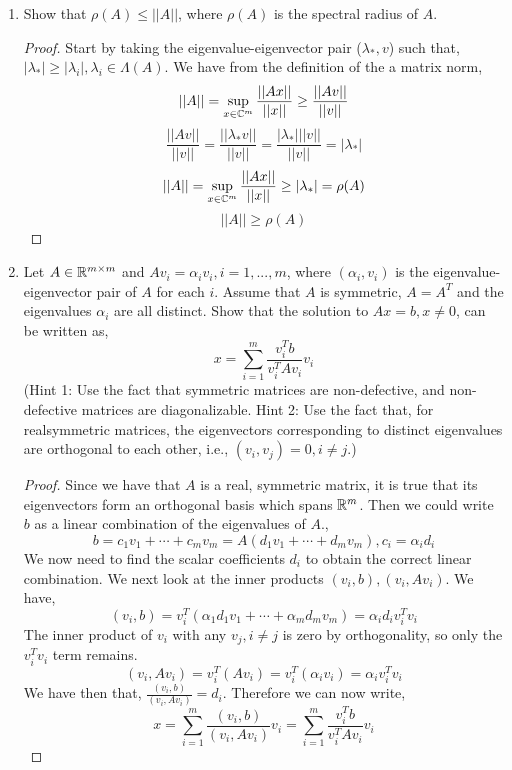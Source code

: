 \documentclass{article}
\begin{document}
\begin{enumerate}
\begin{enumerate}
\begin{proof}
        \end{proof}

        \item

     \end{enumerate}
    
     \item 
      Show that $\rho(A) \le ||A||$, where $\rho(A)$ is the spectral radius of $A$.
    
    \begin{proof}

    Start by taking the eigenvalue-eigenvector pair ($\lambda_*, v$) such that, $|\lambda_*| \ge |\lambda_i|, \lambda_i \in \Lambda(A)$. We have from the definition of the a matrix norm, 
    \[
        ||A|| = \sup_{x \in \mathbb{C}^m} \frac{||Ax||}{||x||} \ge \frac{||Av||}{||v||}
    \]
    \[
        \frac{||Av||}{||v||} = \frac{||\lambda_* v||}{||v||} = \frac{|\lambda_*| ||v||}{||v||} = |\lambda_*|
    \]
    \[
        ||A|| = \sup_{x \in \mathbb{C}^m} \frac{||Ax||}{||x||} \ge |\lambda_*| = \rho(A)
    \]
    \[
        ||A|| \ge \rho(A)   
    \]
    \end{proof}

    \item 
    Let $A \in \mathbb{R}^{m\times m}$ and $Av_i = \alpha_i v_i, i = 1, . . . , m$, where $(\alpha_i , v_i)$ is the eigenvalue-eigenvector pair of $A$ for each $i$. Assume that $A$ is symmetric, $A = A^T$ and the eigenvalues $\alpha_i$ are all distinct. Show that the solution to $Ax = b, x \neq 0$, can be written as, 
\[
    x = \sum_{i=1}^m\frac{v_i^Tb}{v_i^TAv_i}v_i
\]
(Hint 1: Use the fact that symmetric matrices are non-defective, and non-defective matrices are diagonalizable. Hint 2: Use the fact that, for realsymmetric matrices, the eigenvectors corresponding to distinct eigenvalues are orthogonal to each other, i.e., $(v_i , v_j) = 0, i \neq j.$)
   
    \begin{proof}
    
    Since we have that $A$ is a real, symmetric matrix, it is true that its eigenvectors form an orthogonal basis which spans $\mathbb{R}^m$. Then we could write $b$ as a linear combination of the eigenvalues of $A$., 
    \[
        b = c_1v_1 + \cdots + c_mv_m = A(d_1v_1 + \cdots + d_mv_m), c_i = \alpha_i d_i
    \]  
    We now need to find the scalar coefficients $d_i$ to obtain the correct linear combination. We next look at the inner products $(v_i, b), (v_i, Av_i)$. We have, 
    \[
        (v_i, b) = v_i^T(\alpha_1d_1v_1 + \cdots + \alpha_md_mv_m) = \alpha_id_iv_i^Tv_i
    \]
    The inner product of $v_i$ with any $v_j, i\neq j$ is zero by orthogonality, so only the $v_i^Tv_i$ term remains. 
    \[
        (v_i, Av_i) = v_i^T(Av_i) = v_i^T(\alpha_iv_i) = \alpha_i v_i^Tv_i
    \]
    We have then that, $\frac{(v_i, b)}{(v_i, Av_i)} = d_i$. Therefore we can now write, 
    \[
        x = \sum_{i=1}^m \frac{(v_i, b)}{(v_i, Av_i)}v_i = \sum_{i=1}^m \frac{v_i^T b}{v_i^TAv_i}v_i
    \]
    \end{proof} 


\end{enumerate}
\end{document}
